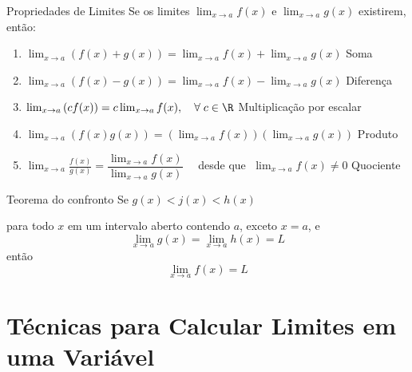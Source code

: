 \documentclass[fleqn,utf8,aspectratio=169,12pt]{beamer}
\begin{document}
\begin{frame}{Propriedades de Limites}
  Se os limites \(\lim_{x\to a}f(x)\) e  \(\lim_{x\to a}g(x)\) existirem, então:\\[4mm]
  \pause
  \begin{enumerate}[<+->]
    \item
      \(
        \lim_{x\to a} \left(f(x)+g(x)\right)
        = \lim_{x\to a}f(x) + \lim_{x\to a}g(x)
      \)
      \hfill Soma
      \\[5mm]

    \item
      \(
        \lim_{x\to a} \left(f(x)-g(x)\right)
        = \lim_{x\to a}f(x) - \lim_{x\to a}g(x)
      \)
      \hfill Diferença
      \\[5mm]

    \item
      \(
        \lim_{x\to a} \left(c f(x)\right)
        = c\lim_{x\to a} f(x),\quad \forall\; c\in\R
      \)
      \hfill Multiplicação por escalar
      \\[5mm]

    \item
      \(
        \lim_{x\to a} \left(f(x)g(x)\right)
        = \left(\lim_{x\to a} f(x)\right)\left(\lim_{x\to a} g(x)\right)
      \)
      \hfill Produto
      \\[5mm]

    \item
      \(
        \lim_{x\to a} \frac{f(x)}{g(x)}
        = \dfrac{\displaystyle \lim_{x\to a} f(x)}{\displaystyle \lim_{x\to a} g(x)}\quad
      \)
      desde que $\;\lim_{x\to a} f(x) \neq 0$
      \hfill Quociente
  \end{enumerate}
\end{frame}

\begin{frame}{Teorema do confronto}
  Se \(g(x) < j(x) < h(x)\)

  \pause
  para todo $x$ em um intervalo aberto contendo $a$,
  \pause
  exceto $x = a$,
  \pause
  e
  \[
    \lim_{x\to a} g(x) = \lim_{x\to a} h(x) = L
  \]
  \pause
  então
  \[
   \lim_{x\to a} f(x) = L
  \]
\end{frame}

\section{Técnicas para Calcular Limites em uma Variável}
\end{document}
